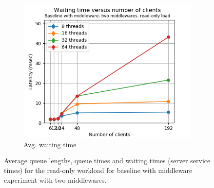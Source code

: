 \documentclass[11pt,a4paper]{article}
\begin{document}
\begin{figure}[h]
\begin{subfigure}{.33\textwidth}
\end{subfigure}%
\begin{subfigure}{.33\textwidth}
  \centering
  \includegraphics[width=1.0\linewidth,trim={0px 0px 0px 0px},clip]{img/plot/mwb2-ro-wtime-mini.png}
  \caption{Avg. waiting time}
  \label{fig:mwb2-ro-wtime-mini}
\end{subfigure}
\caption{Average queue lengths, queue times and waiting times (server service times) for the read-only workload for baseline with middleware experiment with two middlewares.}
\label{fig:mwb2-ro-mini}
\end{figure}
\end{document}
